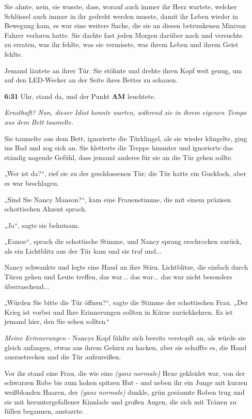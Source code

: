 {Sie ahnte, nein, sie wusste, dass, worauf auch immer ihr Herz wartete, welcher Schlüssel auch immer in ihr gedreht werden musste, damit ihr Leben wieder in Bewegung kam, es war eine weitere Sache, die sie an diesen betrunkenen Minivan Fahrer verloren hatte. Sie dachte fast jeden Morgen darüber nach und versuchte zu erraten, was ihr fehlte, was sie vermisste, was ihrem Leben und ihrem Geist fehlte.

Jemand läutete an ihrer Tür. Sie stöhnte und drehte ihren Kopf weit genug, um auf den LED-Wecker an der Seite ihres Bettes zu schauen.

\textbf{6:31} Uhr, stand da, und der Punkt \textbf{AM} leuchtete.

\emph{Ernsthaft? Nun, dieser Idiot konnte warten, während sie in ihrem eigenen Tempo aus dem Bett taumelte.}

Sie taumelte aus dem Bett, ignorierte die Türklingel, als sie wieder klingelte, ging ins Bad und zog sich an. Sie kletterte die Treppe hinunter und ignorierte das ständig nagende Gefühl, dass jemand anderes für sie an die Tür gehen sollte.

„Wer ist da?“, rief sie zu der geschlossenen Tür; die Tür hatte ein Guckloch, aber es war beschlagen.

„Sind Sie Nancy Manson?“, kam eine Frauenstimme, die mit einem präzisen schottischen Akzent sprach.

„Ja“, sagte sie behutsam.

„Eunoe“, sprach die schottische Stimme, und Nancy sprang erschrocken zurück, als ein Lichtblitz aus der Tür kam und sie traf und...

Nancy schwankte und legte eine Hand an ihre Stirn. Lichtblitze, die einfach durch Türen gehen und Leute treffen, das war... das war... das war nicht besonders überraschend...

„Würden Sie bitte die Tür öffnen?“, sagte die Stimme der schottischen Frau. „Der Krieg ist vorbei und Ihre Erinnerungen sollten in Kürze zurückkehren. Es ist jemand hier, den Sie sehen sollten.“

\emph{Meine Erinnerungen} - Nancys Kopf fühlte sich bereits verstopft an, als würde sie gleich anfangen, etwas aus ihrem Gehirn zu hacken, aber sie schaffte es, die Hand auszustrecken und die Tür aufzureißen.

Vor ihr stand eine Frau, die wie eine \emph{(ganz normale)} Hexe gekleidet war, von der schwarzen Robe bis zum hohen spitzen Hut - und neben ihr ein Junge mit kurzen weißblonden Haaren, der \emph{(ganz normale)} dunkle, grün gesäumte Roben trug und sie mit heruntergefallener Kinnlade und großen Augen, die sich mit Tränen zu füllen begannen, anstarrte.

}
